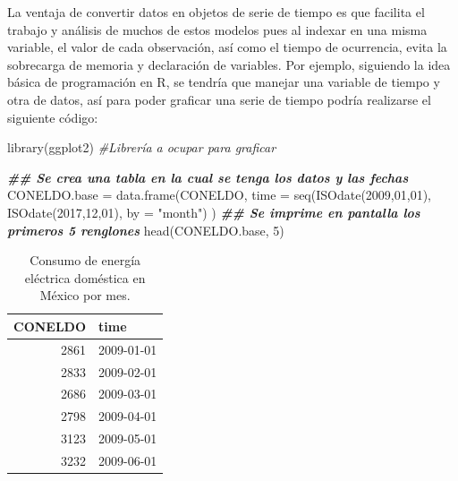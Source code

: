 \documentclass[
  spanish,
]{book}
\newenvironment{Shaded}{\begin{snugshade}}{\end{snugshade}}
\newcommand{\AttributeTok}[1]{\textcolor[rgb]{0.77,0.63,0.00}{#1}}
\newcommand{\CommentTok}[1]{\textcolor[rgb]{0.56,0.35,0.01}{\textit{#1}}}
\newcommand{\DecValTok}[1]{\textcolor[rgb]{0.00,0.00,0.81}{#1}}
\newcommand{\DocumentationTok}[1]{\textcolor[rgb]{0.56,0.35,0.01}{\textbf{\textit{#1}}}}
\newcommand{\FunctionTok}[1]{\textcolor[rgb]{0.00,0.00,0.00}{#1}}
\newcommand{\NormalTok}[1]{#1}
\newcommand{\OtherTok}[1]{\textcolor[rgb]{0.56,0.35,0.01}{#1}}
\newcommand{\StringTok}[1]{\textcolor[rgb]{0.31,0.60,0.02}{#1}}
\theoremstyle{remark}
\begin{document}
La ventaja de convertir datos en objetos de serie de tiempo es que facilita el trabajo y análisis de muchos de estos modelos pues al indexar en una misma variable, el valor de cada observación, así como el tiempo de ocurrencia, evita la sobrecarga de memoria y declaración de variables. Por ejemplo, siguiendo la idea básica de programación en R, se tendría que manejar una variable de tiempo y otra de datos, así para poder graficar una serie de tiempo podría realizarse el siguiente código:

\begin{Shaded}
\begin{Highlighting}[]
\FunctionTok{library}\NormalTok{(ggplot2) }\CommentTok{\#Librería a ocupar para graficar}

\DocumentationTok{\#\# Se crea una tabla en la cual se tenga los datos y las fechas}
\NormalTok{CONELDO.base }\OtherTok{=} \FunctionTok{data.frame}\NormalTok{(CONELDO, }
                          \AttributeTok{time =} \FunctionTok{seq}\NormalTok{(}\FunctionTok{ISOdate}\NormalTok{(}\DecValTok{2009}\NormalTok{,}\DecValTok{01}\NormalTok{,}\DecValTok{01}\NormalTok{), }
                                     \FunctionTok{ISOdate}\NormalTok{(}\DecValTok{2017}\NormalTok{,}\DecValTok{12}\NormalTok{,}\DecValTok{01}\NormalTok{),}
                                     \AttributeTok{by =} \StringTok{"month"}\NormalTok{) }
\NormalTok{                          )}
\DocumentationTok{\#\# Se imprime en pantalla los primeros 5 renglones}
\FunctionTok{head}\NormalTok{(CONELDO.base, }\DecValTok{5}\NormalTok{)}
\end{Highlighting}
\end{Shaded}

\begin{table}

\caption{\label{tab:unnamed-chunk-9}Consumo de energía eléctrica doméstica en México por mes.}
\centering
\begin{tabular}[t]{r|l}
\hline
CONELDO & time\\
\hline
2861 & 2009-01-01\\
\hline
2833 & 2009-02-01\\
\hline
2686 & 2009-03-01\\
\hline
2798 & 2009-04-01\\
\hline
3123 & 2009-05-01\\
\hline
3232 & 2009-06-01\\
\hline
\end{tabular}
\end{table}
\end{document}
